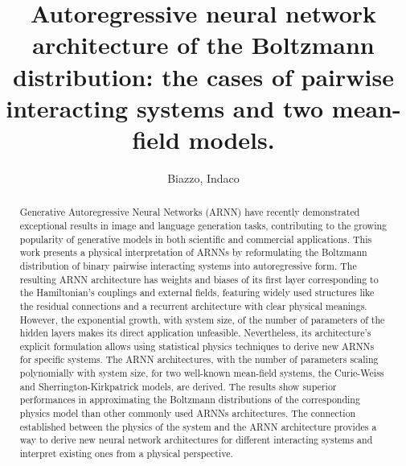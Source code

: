 \documentclass[aps,physrev,10pt,floatfix,reprint]{revtex4-2}
\begin{document}
\title{Autoregressive neural network architecture of the Boltzmann distribution: the cases of pairwise interacting systems and two mean-field models.}
\author{Biazzo, Indaco}

\begin{abstract}
    Generative Autoregressive Neural Networks (ARNN) have recently demonstrated exceptional results in image and language generation tasks, contributing to the growing popularity of generative models in both scientific and commercial applications. This work presents a physical interpretation of ARNNs by reformulating the Boltzmann distribution of binary pairwise interacting systems into autoregressive form. The resulting ARNN architecture has weights and biases of its first layer corresponding to the Hamiltonian's couplings and external fields, featuring widely used structures like the residual connections and a recurrent architecture with clear physical meanings. However, the exponential growth, with system size, of the number of parameters of the hidden layers makes its direct application unfeasible. Nevertheless, its architecture's explicit formulation allows using statistical physics techniques to derive new ARNNs for specific systems. The ARNN architectures, with the number of parameters scaling polynomially with system size, for two well-known mean-field systems, the Curie-Weiss and Sherrington-Kirkpatrick models, are derived. The results show superior performances in approximating the Boltzmann distributions of the corresponding physics model than other commonly used ARNNs architectures. The connection established between the physics of the system and the ARNN architecture provides a way to derive new neural network architectures for different interacting systems and interpret existing ones from a physical perspective.


\end{abstract}
\end{document}
